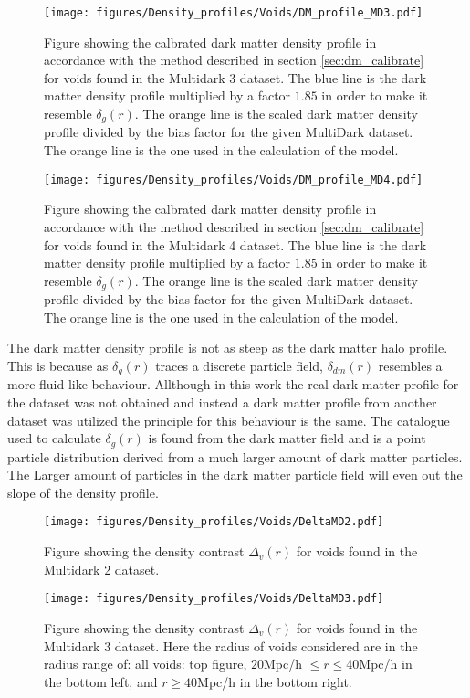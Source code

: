 \begin{figure}[htbp]
    \texttt{[image: figures/Density\_profiles/Voids/DM\_profile\_MD3.pdf]}
    \caption{Figure showing the calbrated dark matter density profile in accordance with the method described in section \ref{sec:dm_calibrate} for voids found in the Multidark 3 dataset. The blue line is the dark matter density profile multiplied by a factor $1.85$ in order to make it resemble $\delta_g(r)$. The orange line is the scaled dark matter density profile divided by the bias factor for the given MultiDark dataset. The orange line is the one used in the calculation of the model.}
    \label{fig:deltadmMD3}
\end{figure}

\begin{figure}[htbp]
    \texttt{[image: figures/Density\_profiles/Voids/DM\_profile\_MD4.pdf]}
    \caption{Figure showing the calbrated dark matter density profile in accordance with the method described in section \ref{sec:dm_calibrate} for voids found in the Multidark 4 dataset. The blue line is the dark matter density profile multiplied by a factor $1.85$ in order to make it resemble $\delta_g(r)$. The orange line is the scaled dark matter density profile divided by the bias factor for the given MultiDark dataset. The orange line is the one used in the calculation of the model.}
    \label{fig:deltadmMD4}
\end{figure}
The dark matter density profile is not as steep as the dark matter halo profile. This is because as $\delta_g(r)$ traces a discrete particle field, $\delta_{dm}(r)$ resembles a more fluid like behaviour. Allthough in this work the real dark matter profile for the dataset was not obtained and instead a dark matter profile from another dataset was utilized the principle for this behaviour is the same. The catalogue used to calculate $\delta_g(r)$ is found from the dark matter field and is a point particle distribution derived from a much larger amount of dark matter particles. The Larger amount of particles in the dark matter particle field will even out the slope of the density profile.\\\indent
\begin{figure}[htbp]
    \texttt{[image: figures/Density\_profiles/Voids/DeltaMD2.pdf]}
    \caption{Figure showing the density contrast $\Delta_v(r)$ for voids found in the Multidark 2 dataset.}
    \label{fig:DeltaMD2}
\end{figure}
\begin{figure}[htbp]
    \texttt{[image: figures/Density\_profiles/Voids/DeltaMD3.pdf]}
    \caption{Figure showing the density contrast $\Delta_v(r)$ for voids found in the Multidark 3 dataset. Here the radius of voids considered are in the radius range of: all voids: top figure, $20$Mpc/h $\leq r\leq 40$Mpc/h in the bottom left, and $r\geq 40$Mpc/h in the bottom right.}
    \label{fig:DeltaMD3}
\end{figure}
